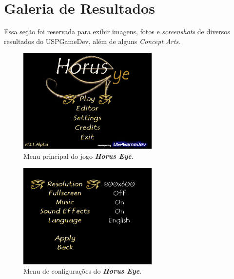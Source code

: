 \documentclass[12pt,onecolumn,a4paper]{article}
\begin{document}


\clearpage
\section{\LARGE Galeria de Resultados}

    Essa seção foi reservada para exibir imagens, fotos e \textit{screenshots} de diversos
    resultados do USPGameDev, além de alguns \textit{Concept Arts}\footnotemark.
        
    
        \FloatBarrier
        
    
        \begin{figure}[htb]
            \centering
            \includegraphics[width=0.62\textwidth]{images/horus_01.png}
            \caption{Menu principal do jogo \textit{\textbf{Horus Eye}}.}
            \label{fig:horus_01}
        \end{figure}
        
        \begin{figure}[htb]
            \centering
            \includegraphics[width=0.62\textwidth]{images/horus_02.png}
            \caption{Menu de configurações do \textit{\textbf{Horus Eye}}.}
            \label{fig:horus_02}
        \end{figure}
        
\end{document}
